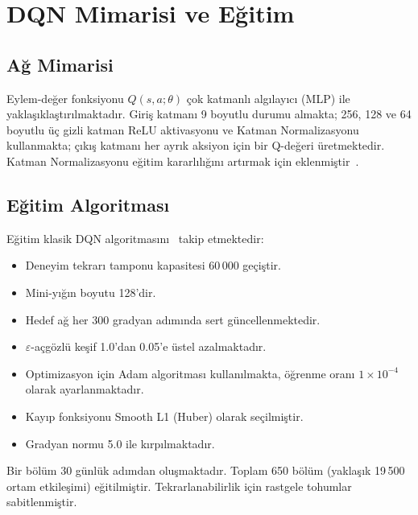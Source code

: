 \documentclass[10pt,twocolumn,a4paper]{article}
\begin{document}
\section{DQN Mimarisi ve E\u{g}itim}
\subsection{A\u{g} Mimarisi}
Eylem-de\u{g}er fonksiyonu $Q(s,a;\theta)$ \c{c}ok katmanl{\i} alg{\i}lay{\i}c{\i} (MLP) ile yakla\c{s}{\i}kla\c{s}t{\i}r{\i}lmaktad{\i}r. Giri\c{s} katman{\i} 9 boyutlu durumu almakta; 256, 128 ve 64 boyutlu \"u\c{c} gizli katman ReLU aktivasyonu ve Katman Normalizasyonu kullanmakta; \c{c}{\i}k{\i}\c{s} katman{\i} her ayr{\i}k aksiyon i\c{c}in bir Q-de\u{g}eri \"uretmektedir. Katman Normalizasyonu e\u{g}itim kararl{\i}l{\i}\u{g}{\i}n{\i} art{\i}rmak i\c{c}in eklenmi\c{s}tir~\cite{ba2016layer}.

\subsection{E\u{g}itim Algoritmas{\i}}
E\u{g}itim klasik DQN algoritmas{\i}n{\i}~\cite{mnih2015human} takip etmektedir:
\begin{itemize}
    \item Deneyim tekrar{\i} tamponu kapasitesi 60\,000 ge\c{c}i\c{s}tir.
    \item Mini-y{\i}\u{g}{\i}n boyutu 128'dir.
    \item Hedef a\u{g} her 300 gradyan ad{\i}m{\i}nda sert g\"uncellenmektedir.
    \item $\varepsilon$-a\c{c}g\"ozl\"u ke\c{s}if 1.0'dan 0.05'e \"ustel azalmaktad{\i}r.
    \item Optimizasyon i\c{c}in Adam algoritmas{\i} kullan{\i}lmakta, \"o\u{g}renme oran{\i} $1\times10^{-4}$ olarak ayarlanmaktad{\i}r.
    \item Kay{\i}p fonksiyonu Smooth L1 (Huber) olarak se\c{c}ilmi\c{s}tir.
    \item Gradyan normu 5.0 ile k{\i}rp{\i}lmaktad{\i}r.
\end{itemize}
Bir b\"ol\"um 30 g\"unl\"uk ad{\i}mdan olu\c{s}maktad{\i}r. Toplam 650 b\"ol\"um (yakla\c{s}{\i}k 19\,500 ortam etkile\c{s}imi) e\u{g}itilmi\c{s}tir. Tekrarlanabilirlik i\c{c}in rastgele tohumlar sabitlenmi\c{s}tir.
\end{document}
